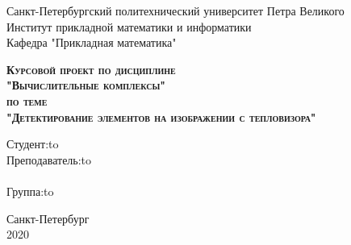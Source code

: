 \begin{center}
	{\Large Санкт-Петербургский политехнический университет Петра Великого}\\
	{\large Институт прикладной математики и информатики \\ Кафедра "Прикладная математика"\\ }
\end{center}
\vspace{10em}

\begin{center}
	\textsc{\textbf{Курсовой проект по дисциплине \\ "Вычислительные комплексы" \\ по теме \\ "Детектирование элементов на изображении с тепловизора" \\}}
\end{center}

\vspace{10em}

\newbox{\lbox}
\newlength{\maxl}
\setlength{\maxl}{\wd\lbox}
\hfill\parbox{11cm}{
	\hspace*{5cm}\hspace*{-5cm}Студент:\hfill\hbox to\\
	\hspace*{5cm}\hspace*{-5cm}Преподаватель:\hfill\hbox to\\
	\\
	\hspace*{5cm}\hspace*{-5cm}Группа:\hfill\hbox to\\
}

\vspace{15em}

\begin{center}
	{\large Санкт-Петербург\\}
	\vspace{1em}
	{\large 2020 }
\end{center}